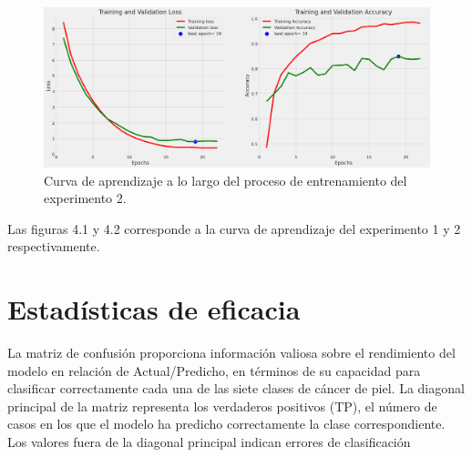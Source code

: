 \begin{figure}[ht]%
    \begin{center}
        \includegraphics[width=1\textwidth]{./Graphics/training&validation_p3.png}
        \caption{Curva de aprendizaje a lo largo del proceso de entrenamiento del experimento 2.\label{fig:training_validation_loss_p2}}
    \end{center}
\end{figure}

Las figuras 4.1 y 4.2 corresponde a la curva de aprendizaje del experimento 1 y 2 respectivamente.

\section*{Estadísticas de eficacia}\label{sub:accuracy_statistic_p1}
La matriz de confusión proporciona información valiosa sobre el rendimiento del modelo en relación de Actual/Predicho, en términos de su capacidad para clasificar correctamente cada una de las siete clases de cáncer de piel. La diagonal principal de la matriz representa los verdaderos positivos (TP), el número de casos en los que el modelo ha predicho correctamente la clase correspondiente. Los valores fuera de la diagonal principal indican errores de clasificación

